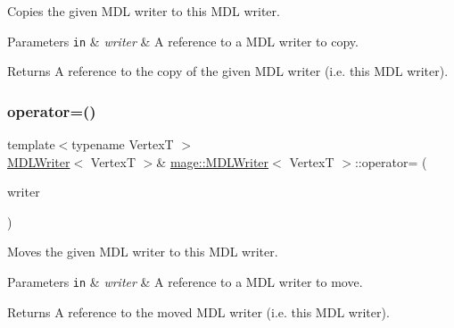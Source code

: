 Copies the given M\+DL writer to this M\+DL writer.


\begin{DoxyParams}[1]{Parameters}
\mbox{\tt in}  & {\em writer} & A reference to a M\+DL writer to copy. \\
\hline
\end{DoxyParams}
\begin{DoxyReturn}{Returns}
A reference to the copy of the given M\+DL writer (i.\+e. this M\+DL writer). 
\end{DoxyReturn}
\hypertarget{classmage_1_1_m_d_l_writer_ac2da6334ef4c6c10af7ce5e94ee46dd1}{}\label{classmage_1_1_m_d_l_writer_ac2da6334ef4c6c10af7ce5e94ee46dd1} 
\subsubsection{\texorpdfstring{operator=()}{operator=()}\hspace{0.1cm}{\footnotesize\ttfamily [2/2]}}
{\footnotesize\ttfamily template$<$typename VertexT $>$ \\
\hyperlink{classmage_1_1_m_d_l_writer}{M\+D\+L\+Writer}$<$ VertexT $>$\& \hyperlink{classmage_1_1_m_d_l_writer}{mage\+::\+M\+D\+L\+Writer}$<$ VertexT $>$\+::operator= (\begin{DoxyParamCaption}\item[{\hyperlink{classmage_1_1_m_d_l_writer}{M\+D\+L\+Writer}$<$ VertexT $>$ \&\&}]{writer }\end{DoxyParamCaption})\hspace{0.3cm}{\ttfamily [delete]}}

Moves the given M\+DL writer to this M\+DL writer.


\begin{DoxyParams}[1]{Parameters}
\mbox{\tt in}  & {\em writer} & A reference to a M\+DL writer to move. \\
\hline
\end{DoxyParams}
\begin{DoxyReturn}{Returns}
A reference to the moved M\+DL writer (i.\+e. this M\+DL writer). 
\end{DoxyReturn}
\hypertarget{classmage_1_1_m_d_l_writer_aa326a70b449baae2d7db8043e2731327}{}\label{classmage_1_1_m_d_l_writer_aa326a70b449baae2d7db8043e2731327} 
